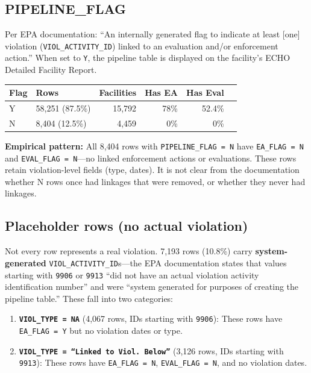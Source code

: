 \documentclass[11pt]{article}
\begin{document}
\subsection*{PIPELINE\_FLAG}

Per EPA documentation: ``An internally generated flag to indicate at least [one] violation (\texttt{VIOL\_ACTIVITY\_ID}) linked to an evaluation and/or enforcement action.'' When set to \texttt{Y}, the pipeline table is displayed on the facility's ECHO Detailed Facility Report.

\begin{table}[H]
\centering
\begin{tabular}{llrrrr}
\toprule
Flag & Rows & Facilities & Has EA & Has Eval \\
\midrule
Y & 58,251 (87.5\%) & 15,792 & 78\% & 52.4\% \\
N & 8,404 (12.5\%) & 4,459 & 0\% & 0\% \\
\bottomrule
\end{tabular}
\end{table}

\noindent\textbf{Empirical pattern:} All 8,404 rows with \texttt{PIPELINE\_FLAG = N} have \texttt{EA\_FLAG = N} and \texttt{EVAL\_FLAG = N}---no linked enforcement actions or evaluations. These rows retain violation-level fields (type, dates). It is not clear from the documentation whether N rows once had linkages that were removed, or whether they never had linkages.

\subsection*{Placeholder rows (no actual violation)}

Not every row represents a real violation. 7,193 rows (10.8\%) carry \textbf{system-generated} \texttt{VIOL\_ACTIVITY\_ID}s---the EPA documentation states that values starting with \texttt{9906} or \texttt{9913} ``did not have an actual violation activity identification number'' and were ``system generated for purposes of creating the pipeline table.'' These fall into two categories:

\begin{enumerate}[nosep]
  \item \textbf{\texttt{VIOL\_TYPE = NA}} (4,067 rows, IDs starting with \texttt{9906}): These rows have \texttt{EA\_FLAG = Y} but no violation dates or type.

  \item \textbf{\texttt{VIOL\_TYPE = ``Linked to Viol.\ Below''}} (3,126 rows, IDs starting with \texttt{9913}): These rows have \texttt{EA\_FLAG = N}, \texttt{EVAL\_FLAG = N}, and no violation dates.
\end{enumerate}
\end{document}
